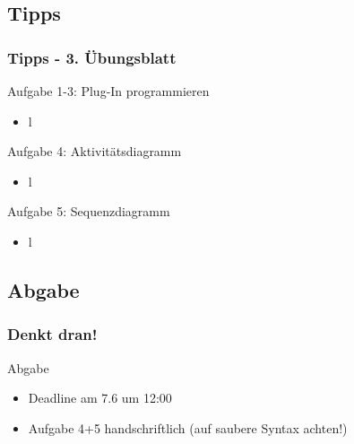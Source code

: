 \documentclass[18pt]{beamer}
\begin{document}
	\subsection{Tipps}
	\begin{frame}
		\frametitle{Tipps - 3. Übungsblatt}
		\begin{small}
			\begin{exampleblock}{Aufgabe 1-3: Plug-In programmieren}
				\begin{itemize}
					\item l%
				\end{itemize}
			\end{exampleblock}
			\pause
			\begin{exampleblock}{Aufgabe 4: Aktivitätsdiagramm}
				\begin{itemize}
					\item l%
				\end{itemize}
			\end{exampleblock}
			\pause
			\begin{exampleblock}{Aufgabe 5: Sequenzdiagramm}
				\begin{itemize}
					\item l%
				\end{itemize}
			\end{exampleblock}
		\end{small}
	\end{frame}
	
	\subsection{Abgabe}
	\begin{frame}
		\frametitle{Denkt dran!}
		\begin{alertblock}{Abgabe}
			\begin{itemize}
				\item Deadline am 7.6 um 12:00
				\item Aufgabe 4+5 handschriftlich (auf saubere Syntax achten!)
			\end{itemize}
		\end{alertblock}
	\end{frame}
		
\end{document}
